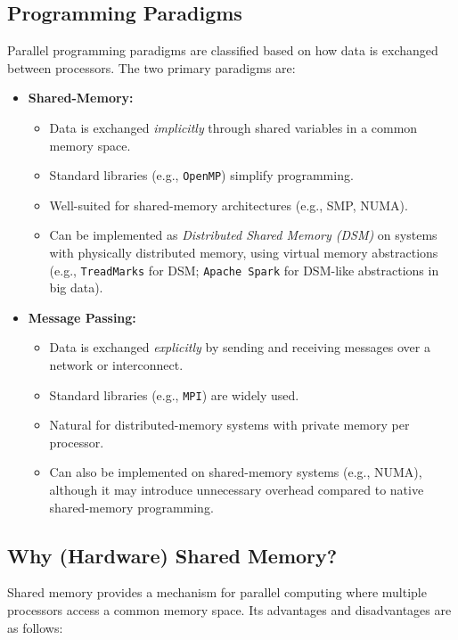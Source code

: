 \subsection{Programming Paradigms}
Parallel programming paradigms are classified based on how data is exchanged between processors. The two primary paradigms are:

\begin{itemize}
    \item \textbf{Shared-Memory:}
    \begin{itemize}
        \item Data is exchanged \emph{implicitly} through shared variables in a common memory space.
        \item Standard libraries (e.g., \texttt{OpenMP}) simplify programming.
        \item Well-suited for shared-memory architectures (e.g., SMP, NUMA).
        \item Can be implemented as \emph{Distributed Shared Memory (DSM)} on systems with physically distributed memory, using virtual memory abstractions (e.g., \texttt{TreadMarks} for DSM; \texttt{Apache Spark} for DSM-like abstractions in big data).
    \end{itemize}

    \item \textbf{Message Passing:}
    \begin{itemize}
        \item Data is exchanged \emph{explicitly} by sending and receiving messages over a network or interconnect.
        \item Standard libraries (e.g., \texttt{MPI}) are widely used.
        \item Natural for distributed-memory systems with private memory per processor.
        \item Can also be implemented on shared-memory systems (e.g., NUMA), although it may introduce unnecessary overhead compared to native shared-memory programming.
    \end{itemize}
\end{itemize}
\newpage
\subsection{Why (Hardware) Shared Memory?}

Shared memory provides a mechanism for parallel computing where multiple processors access a common memory space. Its advantages and disadvantages are as follows:

